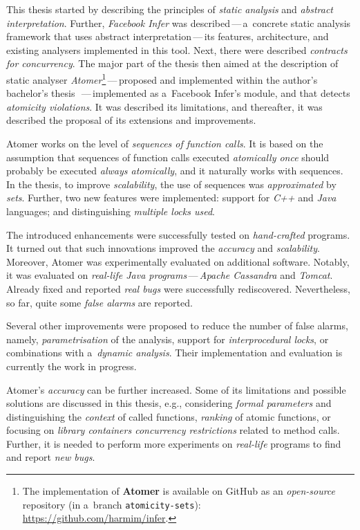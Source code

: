 This thesis started by describing the principles of \emph{static analysis}
and \emph{abstract interpretation}. Further, \emph{Facebook Infer} was
described\,---\,a~concrete static analysis framework that uses abstract
interpretation\,---\,its features, architecture, and existing analysers
implemented in this tool. Next, there were described \emph{contracts for
concurrency}. The major part of the thesis then aimed at the description of
static analyser \emph{Atomer}\footnote{The implementation of \textbf{Atomer}
is available on GitHub as an \emph{open-source} repository (in a~branch
\texttt{atomicity-sets}):
\url{https://github.com/harmim/infer}.}\,---\,proposed and implemented
within the author's bachelor's thesis~\cite{harmimBP}\,---\,implemented as
a~Facebook Infer's module, and that detects \emph{atomicity violations}.
It was described its limitations, and thereafter, it was described the
proposal of its extensions and improvements.

Atomer works on the level of \emph{sequences of function calls}. It is
based on the assumption that sequences of function calls executed
\emph{atomically once} should probably be executed \emph{always atomically},
and it naturally works with sequences. In the thesis, to improve
\emph{scalability}, the use of sequences was \emph{approximated} by
\emph{sets}. Further, two new features were implemented: support for
\emph{C++} and \emph{Java} languages; and distinguishing \emph{multiple
locks used}.

The introduced enhancements were successfully tested on \emph{hand-crafted}
programs. It turned out that such innovations improved the \emph{accuracy}
and \emph{scalability}. Moreover, Atomer was experimentally evaluated on
additional software. Notably, it was evaluated on \emph{real-life Java
programs}\,---\,\emph{Apache Cassandra} and \emph{Tomcat}. Already fixed
and reported \emph{real bugs} were successfully rediscovered. Nevertheless,
so far, quite some \emph{false alarms} are reported.

Several other improvements were proposed to reduce the number of false
alarms, namely, \emph{parametrisation} of the analysis, support for
\emph{interprocedural locks}, or combinations with a~\emph{dynamic analysis}.
Their implementation and evaluation is currently the work in progress.

Atomer's \emph{accuracy} can be further increased. Some of its limitations
and possible solutions are discussed in this thesis, e.g., considering
\emph{formal parameters} and distinguishing the \emph{context} of
called functions, \emph{ranking} of atomic functions, or focusing on
\emph{library containers concurrency restrictions} related to method
calls. Further, it is needed to perform more experiments on \emph{real-life}
programs to find and report \emph{new bugs}.



